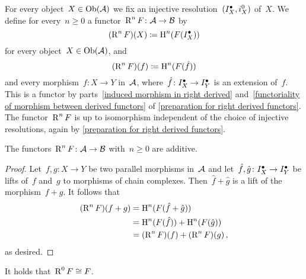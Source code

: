 \begin{remarkdefinition}
  For every object~$X \in \operatorname{Ob}(\mathcal{A})$ we fix an injective resolution~$(I^\bullet_X, i^0_X)$ of~$X$.
  We define for every~$n \geq 0$ a functor~$\operatorname{R}^n F \colon \mathcal{A} \to \mathcal{B}$ by
  \[
    (\operatorname{R}^n F)(X)
    \coloneqq
    \operatorname{H}^n( F(I^\bullet_X) )
  \]
  for every object~$X \in \operatorname{Ob}(\mathcal{A})$, and
  \[
    (\operatorname{R}^n F)(f)
    \coloneqq
    \operatorname{H}^n(F(\hat{f}))
  \]
   and every morphism~$f \colon X \to Y$ in~$\mathcal{A}$, where~$\hat{f} \colon I^\bullet_X \to I^\bullet_Y$ is an extension of~$f$.
  This is a {\welldef} functor by parts~\ref*{induced morphism in right derived} and~\ref*{functoriality of morphism between derived functors} of \cref{preparation for right derived functors}.
  The functor~$\operatorname{R}^n F$ is up to isomorphism independent of the choice of injective resolutions, again by \cref{preparation for right derived functors}.
\end{remarkdefinition}


\begin{lemma}
  The functors~$\operatorname{R}^n F \colon \mathcal{A} \to \mathcal{B}$ with~$n \geq 0$ are additive.
\end{lemma}


\begin{proof}
  Let~$f, g \colon X \to Y$ be two parallel morphisms in~$\mathcal{A}$ and let~$\hat{f}, \hat{g} \colon I^\bullet_X \to I^\bullet_Y$ be lifts of~$f$ and~$g$ to morphisms of chain complexes.
  Then~$\hat{f} + \hat{g}$ is a lift of the morphism~$f + g$.
  It follows that
  \begin{align*}
        (\operatorname{R}^n F)(f + g)
    &=  \operatorname{H}^n(F(\hat{f}+\hat{g})) \\
    &=  \operatorname{H}^n(F(\hat{f})) + \operatorname{H}^n(F(\hat{g})) \\
    &=  (\operatorname{R}^n F)(f) + (\operatorname{R}^n F)(g) \,,
  \end{align*}
  as desired.
\end{proof}


\begin{lemma}
  \label{construction in degree 0}
  It holds that~$\operatorname{R}^0 F \cong F$.
\end{lemma}


